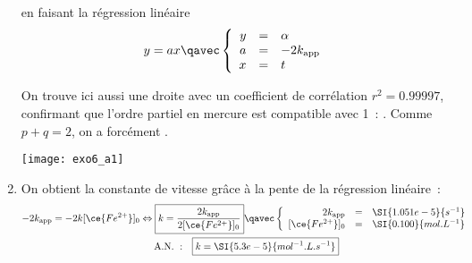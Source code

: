 \documentclass[a4paper, 12pt, final, garamond]{book}
\begin{document}
\begin{enumerate}
        en faisant la régression linéaire
        \[y = ax
            \qavec
            \left\{
                \begin{array}{rcl}
                    y & = & \alpha \\
                    a & = & -2k_{\rm app}\\
                    x & = & t
                \end{array}
            \right.
        \]
        \begin{minipage}{0.45\linewidth}
            On trouve ici aussi une droite avec un coefficient de corrélation
            $r^2 = \num{0.99997}$, confirmant que l'ordre partiel en mercure est
            compatible avec 1~: . Comme $p+q=2$, on a forcément
            .
        \end{minipage}
        \hfill
        \begin{minipage}{0.55\linewidth}
            \begin{center}
                \texttt{[image: exo6\_a1]}
            \end{center}
        \end{minipage}
    \item On obtient la constante de vitesse grâce à la pente de la régression
        linéaire~:
        \begin{gather*}
            -2k_{\rm app} = -2 k[\ce{Fe^{2+}}]_0
            \Leftrightarrow
            \boxed{
            k = \frac{2k_{\rm app}}{2[\ce{Fe^{2+}}]_0}}
            \qavec
            \left\{
                \begin{array}{rcl}
                    2k_{\rm app} & = & \SI{1.051e-5}{s^{-1}}\\\relax
                    [\ce{Fe^{2+}}]_0 & = & \SI{0.100}{mol.L^{-1}}
                \end{array}
            \right.\\
            \mathrm{A.N.~:}\quad
            \boxed{k = \SI{5.3e-5}{mol^{-1}.L.s^{-1}}}
        \end{gather*}
\end{enumerate}
\end{document}
